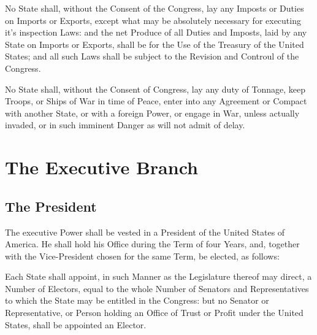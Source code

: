 \documentclass{constitution}
\begin{document}
No State shall, without the Consent of the Congress, lay any Imposts or Duties on Imports or Exports,
except what may be absolutely necessary for executing it's inspection Laws:
and the net Produce of all Duties and Imposts, laid by any State on Imports or Exports, shall be for the Use of the Treasury of the United States;
and all such Laws shall be subject to the Revision and Controul of the Congress.

No State shall, without the Consent of Congress, lay any duty of Tonnage,
keep Troops, or Ships of War in time of Peace,
enter into any Agreement or Compact with another State, or with a foreign Power,
or engage in War, unless actually invaded, or in such imminent Danger as will not admit of delay.

\chapter{The Executive Branch}
\section{The President}
The executive Power shall be vested in a President of the United States of America.
He shall hold his Office during the Term of four Years,
and, together with the Vice-President chosen for the same Term,
be elected, as follows:

Each State shall appoint, in such Manner as the Legislature thereof may direct, a Number of Electors,
equal to the whole Number of Senators and Representatives to which the State may be entitled in the Congress:
but no Senator or Representative, or Person holding an Office of Trust or Profit under the United States, shall be appointed an Elector.
\end{document}
